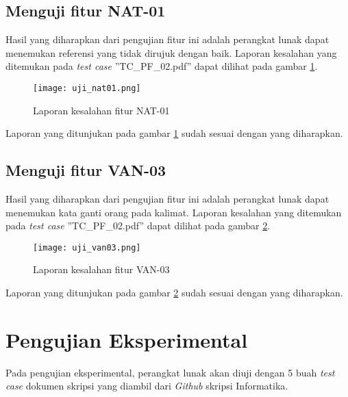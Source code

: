 \subsection{Menguji fitur NAT-01}
Hasil yang diharapkan dari pengujian fitur ini adalah perangkat lunak dapat menemukan referensi yang tidak dirujuk dengan baik. Laporan kesalahan yang ditemukan pada \textit{test case} ''TC\_PF\_02.pdf'' dapat dilihat pada gambar \ref{fig:ujinat01}.

\begin{figure}[H]
	\centering	
	\texttt{[image: uji\_nat01.png]}
	\caption{Laporan kesalahan fitur NAT-01}	
	\label{fig:ujinat01} 
\end{figure}

Laporan yang ditunjukan pada gambar \ref{fig:ujinat01} sudah sesuai dengan yang diharapkan.

\subsection{Menguji fitur VAN-03}
Hasil yang diharapkan dari pengujian fitur ini adalah perangkat lunak dapat menemukan kata ganti orang pada kalimat. Laporan kesalahan yang ditemukan pada \textit{test case} ''TC\_PF\_02.pdf'' dapat dilihat pada gambar \ref{fig:ujivan03}.

\begin{figure}[H]
	\centering	
	\texttt{[image: uji\_van03.png]}
	\caption{Laporan kesalahan fitur VAN-03}	
	\label{fig:ujivan03} 
\end{figure}

Laporan yang ditunjukan pada gambar \ref{fig:ujivan03} sudah sesuai dengan yang diharapkan.

\section{Pengujian Eksperimental}
Pada pengujian eksperimental, perangkat lunak akan diuji dengan 5 buah \textit{test case} dokumen skripsi yang diambil dari \textit{Github} skripsi Informatika.